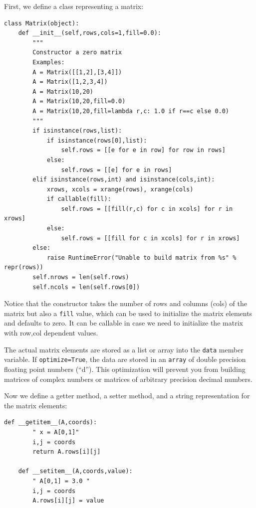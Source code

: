 \documentclass[justified,sixbynine]{tufte-book}
\def\ft{\small\tt}
\theoremstyle{plain}%
\theoremstyle{definition}
\theoremstyle{remark}
\begin{document}
\begin{fullwidth}
First, we define a class representing a matrix:


\begin{lstlisting}[caption={in file: {\ft nlib.py}}]
class Matrix(object):
    def __init__(self,rows,cols=1,fill=0.0):
        """
        Constructor a zero matrix
        Examples:
        A = Matrix([[1,2],[3,4]])
        A = Matrix([1,2,3,4])
        A = Matrix(10,20)
        A = Matrix(10,20,fill=0.0)
        A = Matrix(10,20,fill=lambda r,c: 1.0 if r==c else 0.0)
        """
        if isinstance(rows,list):
            if isinstance(rows[0],list):
                self.rows = [[e for e in row] for row in rows]
            else:
                self.rows = [[e] for e in rows]
        elif isinstance(rows,int) and isinstance(cols,int):
            xrows, xcols = xrange(rows), xrange(cols)
            if callable(fill):
                self.rows = [[fill(r,c) for c in xcols] for r in xrows]
            else:
                self.rows = [[fill for c in xcols] for r in xrows]
        else:
            raise RuntimeError("Unable to build matrix from %s" % repr(rows))
        self.nrows = len(self.rows)
        self.ncols = len(self.rows[0])
\end{lstlisting}

Notice that the constructor takes the number of rows and columns (cols) of the matrix but also a {\ft fill} value, which can be used to initialize the matrix elements and defaults to zero. It can be callable in case we need to initialize the matrix with row,col dependent values.

The actual matrix elements are stored as a list or array into the {\ft data} member variable. If {\ft optimize=True}, the data are stored in an {\ft array} of double precision floating point numbers (``d''). This optimization will prevent you from building matrices of complex numbers or matrices of arbitrary precision decimal numbers.

Now we define a getter method, a setter method, and a string representation for the matrix elements:

\begin{lstlisting}[caption={in file: {\ft nlib.py}}]
    def __getitem__(A,coords):
        " x = A[0,1]"
        i,j = coords
        return A.rows[i][j]

    def __setitem__(A,coords,value):
        " A[0,1] = 3.0 "
        i,j = coords
        A.rows[i][j] = value


\end{lstlisting}
\end{fullwidth}
\end{document}

